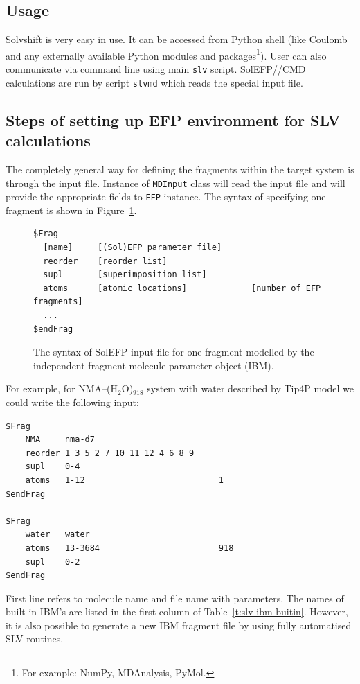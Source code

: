 \documentclass[a4paper,titlepage,twoside,fleqn,12pt]{book}
\begin{document}
\begin{refsection}
\section{Usage}

Solvshift is very easy in use. It can be accessed 
from Python shell (like {\sc Coulomb} and any externally
available Python modules and packages\footnote{For example: NumPy, MDAnalysis, PyMol.}).
User can also communicate via command line using main {\tt slv} script.
SolEFP//CMD calculations are run by script {\tt slv{\textunderscore}md} which reads the
special input file.

\subsection{Steps of setting up EFP environment for SLV calculations}

The completely general way for defining the fragments within the target system
is through the input file. 
Instance of {\tt MDInput} class
will read the input file and will provide the appropriate fields to {\tt EFP} instance. 
The syntax of specifying one fragment
is shown in Figure~\ref{f:slv-inp-file-syntax}.
%
\begin{figure}[t!]
\centering
\setlength\fboxsep{0.4pt}
\setlength\fboxrule{0.5pt}
\begin{verbatim}
$Frag
  [name]     [(Sol)EFP parameter file]
  reorder    [reorder list]
  supl       [superimposition list]
  atoms      [atomic locations]             [number of EFP fragments]
  ...
$endFrag
\end{verbatim}
\caption{
The syntax of SolEFP input file for one fragment modelled by the
independent fragment molecule parameter object (IBM).
\label{f:slv-inp-file-syntax}}
\end{figure}
%
For example, for NMA--(H$_2$O)$_{918}$ system 
with water described by Tip4P model we could 
write the following input:
%
\begin{verbatim}
$Frag
    NMA     nma-d7
    reorder 1 3 5 2 7 10 11 12 4 6 8 9
    supl    0-4
    atoms   1-12                           1
$endFrag

$Frag
    water   water
    atoms   13-3684                        918
    supl    0-2
$endFrag
\end{verbatim}
%
First line refers to molecule name and file name with parameters. 
The names of built-in IBM's are listed in the first column
of Table~\ref{t:slv-ibm-buitin}.
However, it is also possible to generate a new IBM fragment file
by using fully automatised SLV routines.


\end{refsection}
\end{document}
